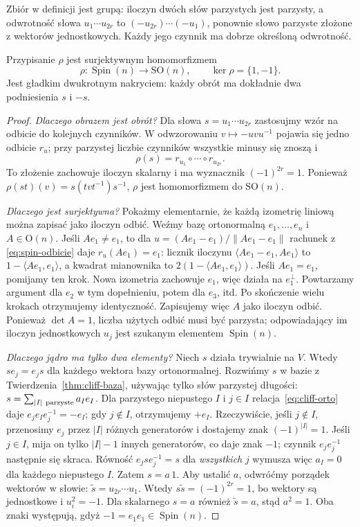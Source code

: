 Zbiór w definicji jest grupą: iloczyn dwóch słów
parzystych jest parzysty, a odwrotność słowa
$u_1\cdots u_{2r}$ to
$(-u_{2r})\cdots(-u_1)$, ponownie słowo parzyste
złożone z wektorów jednostkowych.
Każdy jego czynnik ma dobrze określoną odwrotność.

\begin{twierdzenie}
\label{thm:spin-nakrycie}
Przypisanie $\rho$ jest surjektywnym homomorfizmem
\[
 \rho:\operatorname{Spin}(n)\longrightarrow\mathrm{SO}(n),
 \qquad\ker\rho=\{1,-1\}.
\]
Jest gładkim dwukrotnym nakryciem: każdy obrót
ma dokładnie dwa podniesienia $s$ i $-s$.
\end{twierdzenie}
\begin{proof}
\emph{Dlaczego obrazem jest obrót?}
Dla słowa $s=u_1\cdots u_{2r}$ zastosujmy
wzór na odbicie do kolejnych czynników.
W odwzorowaniu $v\mapsto-u v u^{-1}$ pojawia się
jedno odbicie $r_u$; przy parzystej liczbie
czynników wszystkie minusy się znoszą i
\[
 \rho(s)=r_{u_1}\circ\cdots\circ r_{u_{2r}}.
\]
To złożenie zachowuje iloczyn skalarny i ma
wyznacznik $(-1)^{2r}=1$. Ponieważ
$\rho(st)(v)=s(tvt^{-1})s^{-1}$,
$\rho$ jest homomorfizmem do $\mathrm{SO}(n)$.

\emph{Dlaczego jest surjektywna?}
Pokażmy elementarnie, że każdą izometrię liniową
można zapisać jako iloczyn odbić. Weźmy bazę
ortonormalną $e_1,\ldots,e_n$ i $A\in\mathrm O(n)$.
Jeśli $Ae_1\ne e_1$, to dla
$u=(Ae_1-e_1)/\|Ae_1-e_1\|$ rachunek z
\eqref{eq:spin-odbicie} daje $r_u(Ae_1)=e_1$:
licznik iloczynu
$\langle Ae_1-e_1,Ae_1\rangle$ to
$1-\langle Ae_1,e_1\rangle$, a kwadrat
mianownika to $2(1-\langle Ae_1,e_1\rangle)$.
Jeśli $Ae_1=e_1$, pomijamy ten krok.
Nowa izometria zachowuje $e_1$, więc działa
na $e_1^\perp$. Powtarzamy argument dla $e_2$
w tym dopełnieniu, potem dla $e_3$, itd.
Po skończenie wielu krokach otrzymujemy
identyczność. Zapisujemy więc $A$ jako
iloczyn odbić. Ponieważ $\det A=1$, liczba
użytych odbić musi być parzysta; odpowiadający
im iloczyn jednostkowych $u_j$ jest szukanym
elementem $\operatorname{Spin}(n)$.

\emph{Dlaczego jądro ma tylko dwa elementy?}
Niech $s$ działa trywialnie na $V$. Wtedy
$se_j=e_js$ dla każdego wektora bazy ortonormalnej.
Rozwińmy $s$ w bazie z
Twierdzenia~\ref{thm:cliff-baza}, używając tylko
słów parzystej długości:
$s=\sum_{|I|\ {\rm parzyste}}a_I e_I$.
Dla parzystego niepustego $I$ i $j\in I$
relacja~\eqref{eq:cliff-orto} daje
$e_je_Ie_j^{-1}=-e_I$; gdy $j\notin I$,
otrzymujemy $+e_I$.
Rzeczywiście, jeśli $j\notin I$, przenosimy $e_j$
przez $|I|$ różnych generatorów i dostajemy znak
$(-1)^{|I|}=1$. Jeśli $j\in I$, mija on tylko
$|I|-1$ innych generatorów, co daje znak $-1$;
czynnik $e_je_j^{-1}$ następnie się skraca. Równość
$e_jse_j^{-1}=s$ dla \emph{wszystkich} $j$
wymusza więc $a_I=0$ dla każdego niepustego $I$.
Zatem $s=a\,1$. Aby ustalić $a$, odwróćmy
porządek wektorów w słowie:
$\widetilde s=u_{2r}\cdots u_1$.
Wtedy $s\widetilde s=(-1)^{2r}=1$,
bo wektory są jednostkowe i $u_i^2=-1$.
Dla skalarnego $s=a$ również $\widetilde s=a$,
stąd $a^2=1$. Oba znaki występują,
gdyż $-1=e_1e_1\in\operatorname{Spin}(n)$.


\end{proof}
